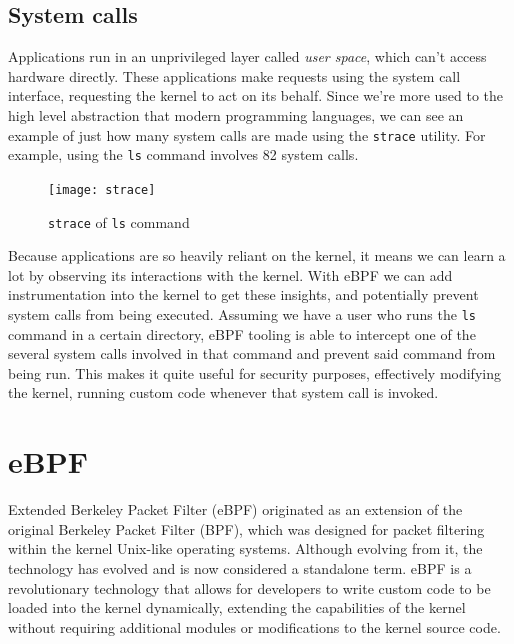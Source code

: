 \subsection{System calls}

Applications run in an unprivileged layer called \textit{user space}, which can't access hardware directly. These applications make requests using the system call interface, requesting the kernel to act on its behalf. Since we're more used to the high level abstraction that modern programming languages, we can see an example of just how many system calls are made using the \texttt{strace} utility. For example, using the \texttt{ls} command involves 82 system calls.
\begin{figure}[h]
	\caption{\texttt{strace} of \texttt{ls} command}
	\centering
	\texttt{[image: strace]}
\end{figure}

Because applications are so heavily reliant on the kernel, it means we can learn a lot by observing its interactions with the kernel. With eBPF we can add instrumentation into the kernel to get these insights, and potentially prevent system calls from being executed.
Assuming we have a user who runs the \texttt{ls} command in a certain directory, eBPF tooling is able to intercept one of the several system calls involved in that command and prevent said command from being run. This makes it quite useful for security purposes, effectively modifying the kernel, running custom code whenever that system call is invoked.

\section{eBPF}

Extended Berkeley Packet Filter (eBPF) \cite{learningeBPF} originated as an extension of the original Berkeley Packet Filter (BPF), which was designed for packet filtering within the kernel Unix-like operating systems. Although evolving from it, the technology has evolved and is now considered a standalone term. eBPF is a revolutionary technology that allows for developers to write custom code to be loaded into the kernel dynamically, extending the capabilities of the kernel without requiring additional modules or modifications to the kernel source code.

